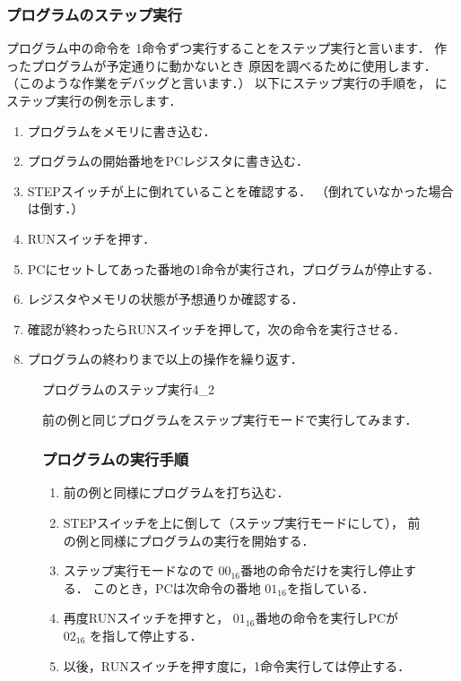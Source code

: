 \subsubsection{プログラムのステップ実行}
\label{step}
プログラム中の命令を
1命令ずつ実行することをステップ実行と言います．
作ったプログラムが予定通りに動かないとき
原因を調べるために使用します．
（このような作業をデバッグと言います．）
以下にステップ実行の手順を，
にステップ実行の例を示します．

\begin{enumerate}
\item プログラムをメモリに書き込む．
\item プログラムの開始番地をPCレジスタに書き込む．
\item STEPスイッチが上に倒れていることを確認する．
（倒れていなかった場合は倒す．）
\item RUNスイッチを押す．
\item PCにセットしてあった番地の1命令が実行され，プログラムが停止する．
\item レジスタやメモリの状態が予想通りか確認する．
\item 確認が終わったらRUNスイッチを押して，次の命令を実行させる．
\item プログラムの終わりまで以上の操作を繰り返す．
\end{enumerate}

\begin{figure}[tb]
\begin{rei}{プログラムのステップ実行}{4_2}

前の例と同じプログラムをステップ実行モードで実行してみます．

\subsubsection{プログラムの実行手順}
\begin{enumerate}
\item 前の例と同様にプログラムを打ち込む．
\item STEPスイッチを上に倒して（ステップ実行モードにして），
前の例と同様にプログラムの実行を開始する．
\item ステップ実行モードなので
$00_{16}$番地の命令だけを実行し停止する．
このとき，PCは次命令の番地 $01_{16}$を指している．
\item 再度RUNスイッチを押すと，
$01_{16}$番地の命令を実行しPCが $02_{16}$ を指して停止する．
\item 以後，RUNスイッチを押す度に，1命令実行しては停止する．
\end{enumerate}
\end{rei}
\end{figure}

